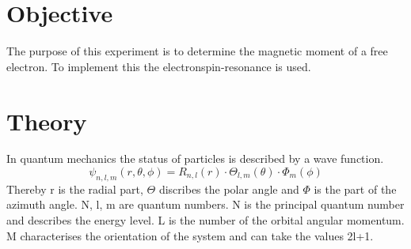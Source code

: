 
\section{Objective}

The purpose of this experiment is to determine the magnetic moment of a free electron.
To implement this the electronspin-resonance is used.


\section{Theory}
In quantum mechanics the status of particles is described by a wave function.
\begin{equation*}
  \psi_{n,l,m}(r,\theta,\phi) = R_{n,l}(r) \cdot \Theta_{l,m}(\theta) \cdot \Phi_m(\phi)
\end{equation*}
Thereby r is the radial part, $\Theta$ discribes the polar angle and
$\Phi$ is the part of the azimuth angle.
N, l, m are quantum numbers.
N is the principal quantum number and describes the energy level.
L is the number of the orbital angular momentum.
M characterises the orientation of the system and can take the values 2l+1.


